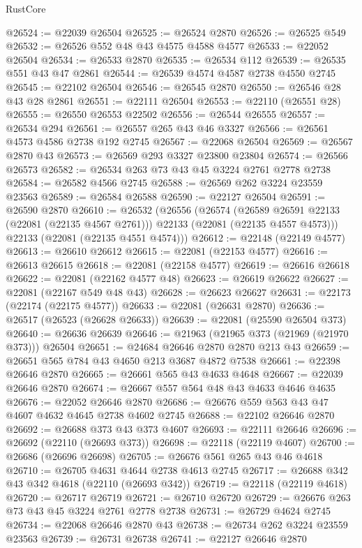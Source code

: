 \begin{lexlean}{RustCore}
\begin{coremodule}
@26524 := @22039 @26504
@26525 := @26524 @2870
@26526 := @26525 @549
@26532 := @26526 @552 @48 @43 @4575 @4588 @4577
@26533 := @22052 @26504
@26534 := @26533 @2870
@26535 := @26534 @112
@26539 := @26535 @551 @43 @47 @2861
@26544 := @26539 @4574 @4587 @2738 @4550 @2745
@26545 := @22102 @26504
@26546 := @26545 @2870
@26550 := @26546 @28 @43 @28 @2861
@26551 := @22111 @26504
@26553 := @22110 (@26551 @28)
@26555 := @26550 @26553 @22502
@26556 := @26544 @26555
@26557 := @26534 @294
@26561 := @26557 @265 @43 @46 @3327
@26566 := @26561 @4573 @4586 @2738 @192 @2745
@26567 := @22068 @26504
@26569 := @26567 @2870 @43
@26573 := @26569 @293 @3327 @23800 @23804
@26574 := @26566 @26573
@26582 := @26534 @263 @73 @43 @45 @3224 @2761 @2778 @2738
@26584 := @26582 @4566 @2745
@26588 := @26569 @262 @3224 @23559 @23563
@26589 := @26584 @26588
@26590 := @22127 @26504
@26591 := @26590 @2870
@26610 := @26532
    (@26556
      (@26574
        (@26589 @26591 @22133 (@22081 (@22135 @4567 @2761)))
        @22133
        (@22081 (@22135 @4557 @4573)))
      @22133
      (@22081 (@22135 @4551 @4574)))
@26612 := @22148 (@22149 @4577)
@26613 := @26610 @26612
@26615 := @22081 (@22153 @4577)
@26616 := @26613 @26615
@26618 := @22081 (@22158 @4577)
@26619 := @26616 @26618
@26622 := @22081 (@22162 @4577 @48)
@26623 := @26619 @26622
@26627 := @22081 (@22167 @549 @48 @43)
@26628 := @26623 @26627
@26631 := @22173 (@22174 (@22175 @4577))
@26633 := @22081 (@26631 @2870)
@26636 := @26517 (@26523 (@26628 @26633))
@26639 := @22081 (@25590 @26504 @373)
@26640 := @26636 @26639
@26646 := @21963 (@21965 @373 (@21969 (@21970 @373))) @26504
@26651 := @24684 @26646 @2870 @2870 @213 @43
@26659 := @26651 @565 @784 @43 @4650 @213 @3687 @4872 @7538
@26661 := @22398 @26646 @2870
@26665 := @26661 @565 @43 @4633 @4648
@26667 := @22039 @26646 @2870
@26674 := @26667 @557 @564 @48 @43 @4633 @4646 @4635
@26676 := @22052 @26646 @2870
@26686 := @26676 @559 @563 @43 @47 @4607 @4632 @4645 @2738 @4602 @2745
@26688 := @22102 @26646 @2870
@26692 := @26688 @373 @43 @373 @4607
@26693 := @22111 @26646
@26696 := @26692 (@22110 (@26693 @373))
@26698 := @22118 (@22119 @4607)
@26700 := @26686 (@26696 @26698)
@26705 := @26676 @561 @265 @43 @46 @4618
@26710 := @26705 @4631 @4644 @2738 @4613 @2745
@26717 := @26688 @342 @43 @342 @4618 (@22110 (@26693 @342))
@26719 := @22118 (@22119 @4618)
@26720 := @26717 @26719
@26721 := @26710 @26720
@26729 := @26676 @263 @73 @43 @45 @3224 @2761 @2778 @2738
@26731 := @26729 @4624 @2745
@26734 := @22068 @26646 @2870 @43
@26738 := @26734 @262 @3224 @23559 @23563
@26739 := @26731 @26738
@26741 := @22127 @26646 @2870

\end{coremodule}
\end{lexlean}
